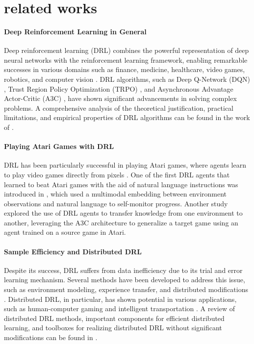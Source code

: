 \section{related works}
\paragraph{Deep Reinforcement Learning in General}
Deep reinforcement learning (DRL) combines the powerful representation of deep neural networks with the reinforcement learning framework, enabling remarkable successes in various domains such as finance, medicine, healthcare, video games, robotics, and computer vision \cite{2108.11510}. DRL algorithms, such as Deep Q-Network (DQN) \cite{1708.05866}, Trust Region Policy Optimization (TRPO) \cite{1708.05866}, and Asynchronous Advantage Actor-Critic (A3C) \cite{1708.05866}, have shown significant advancements in solving complex problems. A comprehensive analysis of the theoretical justification, practical limitations, and empirical properties of DRL algorithms can be found in the work of \cite{1906.10025}.

\paragraph{Playing Atari Games with DRL}
DRL has been particularly successful in playing Atari games, where agents learn to play video games directly from pixels \cite{1708.05866}. One of the first DRL agents that learned to beat Atari games with the aid of natural language instructions was introduced in \cite{1704.05539}, which used a multimodal embedding between environment observations and natural language to self-monitor progress. Another study \cite{1809.00397} explored the use of DRL agents to transfer knowledge from one environment to another, leveraging the A3C architecture to generalize a target game using an agent trained on a source game in Atari. 

\paragraph{Sample Efficiency and Distributed DRL}
Despite its success, DRL suffers from data inefficiency due to its trial and error learning mechanism. Several methods have been developed to address this issue, such as environment modeling, experience transfer, and distributed modifications \cite{2212.00253}. Distributed DRL, in particular, has shown potential in various applications, such as human-computer gaming and intelligent transportation \cite{2212.00253}. A review of distributed DRL methods, important components for efficient distributed learning, and toolboxes for realizing distributed DRL without significant modifications can be found in \cite{2212.00253}.

